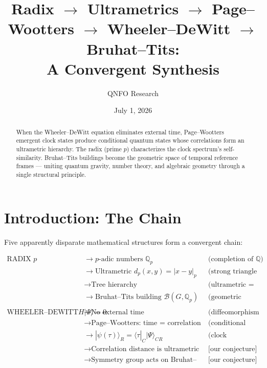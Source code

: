 \documentclass[12pt,a4paper]{article}
\title{%
  Radix $\to$ Ultrametrics $\to$ Page--Wootters $\to$ Wheeler--DeWitt $\to$ Bruhat--Tits:\\
  A Convergent Synthesis}
\author{QNFO Research}
\date{July 1, 2026}
\theoremstyle{definition}
\newcommand{\Q}{\mathbb{Q}}
\newcommand{\Qp}{\mathbb{Q}_p}
\newcommand{\abs}[1]{\lvert#1\rvert}
\newcommand{\ket}[1]{|#1\rangle}
\newcommand{\bra}[1]{\langle #1|}
\newcommand{\pval}[1]{\abs{#1}_p}
\newcommand{\distp}[2]{d_p(#1,#2)}
\newcommand{\bt}{\mathcal{B}}
\begin{document}
\maketitle

\begin{abstract}
When the Wheeler--DeWitt equation eliminates external time, Page--Wootters emergent clock states produce conditional quantum states whose correlations form an ultrametric hierarchy. The radix (prime $p$) characterizes the clock spectrum's self-similarity. Bruhat--Tits buildings become the geometric space of temporal reference frames --- uniting quantum gravity, number theory, and algebraic geometry through a single structural principle.
\end{abstract}

\section{Introduction: The Chain}

Five apparently disparate mathematical structures form a convergent chain:

\begin{equation}
\boxed{
\begin{aligned}
\text{RADIX } p &\longrightarrow \text{$p$-adic numbers } \Qp &&\text{(completion of } \Q) \\
&\longrightarrow \text{Ultrametric } \distp{x}{y} = \pval{x-y} &&\text{(strong triangle inequality)} \\
&\longrightarrow \text{Tree hierarchy} &&\text{(ultrametric = tree metric)} \\
&\longrightarrow \text{Bruhat--Tits building } \bt(G, \Qp) &&\text{(geometric realization)} \\
\\
\text{WHEELER--DEWITT } H\ket{\Psi} = 0 &\longrightarrow \text{No external time} &&\text{(diffeomorphism invariance)} \\
&\longrightarrow \text{Page--Wootters: time = correlation} &&\text{(conditional probability)} \\
&\longrightarrow \ket{\psi(\tau)}_R = \bra{\tau}_C \ket{\Psi}_{CR} &&\text{(clock conditioning)} \\
&\longrightarrow \text{Correlation distance is ultrametric} &&\text{[our conjecture]} \\
&\longrightarrow \text{Symmetry group acts on Bruhat--Tits building} &&\text{[our conjecture]} \\
\end{aligned}}
\end{equation}
\end{document}

